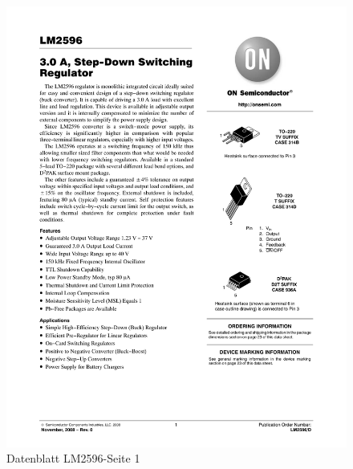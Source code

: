 \documentclass[12pt,a4paper]{article}
\begin{document}
{\begin{figure}[H]
  \centering
		\includegraphics[scale=0.75, angle=0,page=1]{graphics/LM2596.PDF}
		\caption{Datenblatt LM2596-Seite 1}
		\label{datasheet:LM2596-1}
\end{figure}

}
\end{document}
